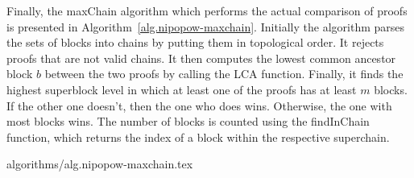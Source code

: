 Finally, the maxChain algorithm which performs the actual comparison of proofs
is presented in Algorithm~\ref{alg.nipopow-maxchain}. Initially the algorithm
parses the sets of blocks into chains by putting them in topological order. It
rejects proofs that are not valid chains. It then computes the lowest common
ancestor block $b$ between the two proofs by calling the LCA function. Finally,
it finds the highest superblock level in which at least one of the proofs has
at least $m$ blocks. If the other one doesn't, then the one who does wins.
Otherwise, the one with most blocks wins. The number of blocks is counted using
the findInChain function, which returns the index of a block within the
respective superchain.

{algorithms/alg.nipopow-maxchain.tex}
